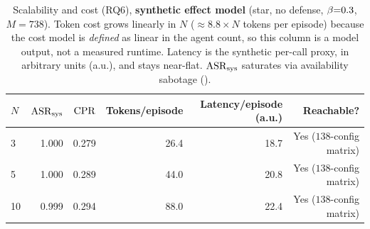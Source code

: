 \begin{table}[t]
\centering
\caption{Scalability and cost (RQ6), \textbf{synthetic effect model} (star, no defense,
$\beta{=}0.3$, $M{=}738$). Token cost grows linearly in $N$ ($\approx 8.8{\times}N$ tokens
per episode) because the cost model is \emph{defined} as linear in the agent count, so this
column is a model output, not a measured runtime. Latency is the synthetic per-call proxy, in
arbitrary units (a.u.), and stays near-flat. $\mathrm{ASR}_{\mathrm{sys}}$ saturates via availability sabotage
().}
\label{tab:cost}
\small
\renewcommand{\arraystretch}{1.08}
\setlength{\tabcolsep}{4pt}
\begin{tabular}{@{}lrrrrr@{}}
\toprule
$N$ & $\mathrm{ASR}_{\mathrm{sys}}$ & $\mathrm{CPR}$ & Tokens/episode & Latency/episode (a.u.) & Reachable? \\
\midrule
3  & 1.000 & 0.279 & 26.4 & 18.7 & Yes ($138$-config matrix) \\
5  & 1.000 & 0.289 & 44.0 & 20.8 & Yes ($138$-config matrix) \\
10 & 0.999 & 0.294 & 88.0 & 22.4 & Yes ($138$-config matrix) \\
\bottomrule
\end{tabular}
\end{table}

